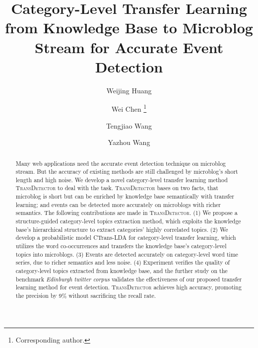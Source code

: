 \documentclass[runningheads,a4paper]{llncs}
\theoremstyle{exampstyle}
\begin{document}
%
\title{Category-Level Transfer Learning from Knowledge Base to Microblog Stream for Accurate Event Detection}
\author{Weijing Huang \and Wei Chen \thanks{Corresponding author.} \and Tengjiao Wang \and Yazhou Wang }

\maketitle
\thispagestyle{empty}
\pagestyle{empty}
%


\begin{abstract}
Many web applications need the accurate event detection technique on microblog stream. 
But the accuracy of existing methods are still challenged by microblog's short length and high noise. 
We develop a novel category-level transfer learning method \textsc{TransDetector} to deal with the task.  
\textsc{TransDetector} bases on two facts, that microblog is short but can be enriched by knowledge base semantically with transfer learning; and events can be detected more accurately on microblogs with richer semantics.
The following contributions are made in \textsc{TransDetector}.
(1) We propose a structure-guided category-level topics extraction method, which exploits the knowledge base's hierarchical structure to extract categories' highly correlated topics. 
(2) We develop a probabilistic model CTrans-LDA for category-level transfer learning, which utilizes the word co-occurrences and transfers the knowledge base's category-level topics into microblogs. 
(3) Events are detected accurately on category-level word time series, due to richer semantics and less noise. 
(4) Experiment verifies the quality of category-level topics extracted from knowledge base, and the further study on the benchmark \textit{Edinburgh twitter corpus} validates the effectiveness of our proposed transfer learning method for event detection.
\textsc{TransDetector} achieves high accuracy, promoting the precision by 9\% without  sacrificing the recall rate.

\end{abstract}
\end{document}
